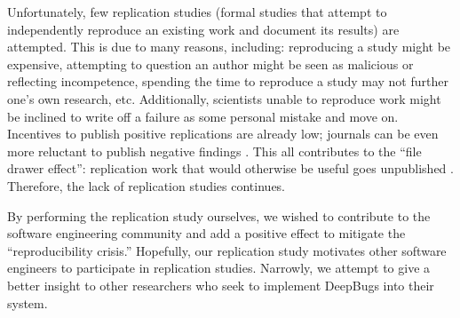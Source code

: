 Unfortunately, few replication studies (formal studies that attempt to independently reproduce an existing work and document its results) are attempted. This is due to many reasons, including: reproducing a study might be expensive, attempting to question an author might be seen as malicious or reflecting incompetence, spending the time to reproduce a study may not further one's own research, etc. Additionally, scientists unable to reproduce work might be inclined to write off a failure as some personal mistake and move on. Incentives to publish positive replications are already low; journals can be even more reluctant to publish negative findings \cite{cacho_state_2020}. This all contributes to the ``file drawer effect'': replication work that would otherwise be useful goes unpublished \cite{cockburn_threats_2020}.  Therefore, the lack of replication studies continues.

 By performing the replication study ourselves, we wished to contribute to the software engineering community and add a positive effect to mitigate the ``reproducibility crisis.'' Hopefully, our replication study motivates other software engineers to participate in replication studies. Narrowly, we attempt to give a better insight to other researchers who seek to implement DeepBugs into their system. 
